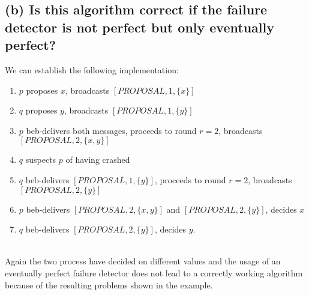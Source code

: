 \documentclass{article}
\begin{document}
\begin{adjustwidth}{2em}{2em}
		\subsection*{(b) Is this algorithm correct if the failure detector is not perfect but only eventually perfect?}
		\begin{adjustwidth}{2em}{2em}
			We can establish the following implementation: \\
			\begin{enumerate}[-]
				\item $p$ proposes $x$, broadcasts $[PROPOSAL, 1, \{x\}]$
				\item $q$ proposes $y$, broadcasts $[PROPOSAL, 1, \{y\}]$
				\item $p$ beb-delivers both messages, proceeds to round $r = 2$, broadcasts $[PROPOSAL, 2, \{x, y\}]$
				\item $q$ suspects $p$ of having crashed
				\item $q$ beb-delivers $[PROPOSAL, 1, \{y\}]$, proceeds to round $r = 2$, broadcasts $[PROPOSAL, 2, \{y\}]$
				\item $p$ beb-delivers $[PROPOSAL, 2, \{x, y\}]$ and $[PROPOSAL, 2, \{y\}]$, decides $x$
				\item $q$ beb-delivers $[PROPOSAL, 2, \{y\}]$, decides $y$.
			\end{enumerate}
			\hfill \\
			Again the two process have decided on different values and the usage of an eventually perfect failure detector does not lead to a correctly working algorithm because of the resulting problems shown in the example.
		\end{adjustwidth}
	\end{adjustwidth}
	
\end{document}
